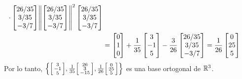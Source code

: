 \begin{solution}
\begin{align*}
{		\cdot
		\begin{bmatrix}
			26/35 \\ 3/35 \\ -3/7
		\end{bmatrix}
		}{\norm{
		\begin{bmatrix}
			26/35 \\ 3/35 \\ -3/7
		\end{bmatrix}
			}^{2}}
		\begin{bmatrix}
			26/35 \\ 3/35 \\ -3/7
		\end{bmatrix}\\
		&=
		\begin{bmatrix}
			0 \\ 1 \\ 0
		\end{bmatrix}
		+
		\dfrac{1}{35}
		\begin{bmatrix}
			3\\ -1 \\ 5
		\end{bmatrix}
		-
		\dfrac{3}{26}
		\begin{bmatrix}
			26/35 \\ 3/35 \\ -3/7
		\end{bmatrix}
		=\dfrac{1}{26}
		\begin{bmatrix}
			0 \\ 25 \\ 5
		\end{bmatrix}
	\end{align*}
	Por lo tanto, $\set{
	\begin{bsmallmatrix}
		3\\ -1 \\ 5
	\end{bsmallmatrix},
	\frac{1}{35}
	\begin{bsmallmatrix}
		26 \\ 3 \\ -15
	\end{bsmallmatrix},
	\frac{1}{26}
	\begin{bsmallmatrix}
		0 \\ 25 \\ 5
	\end{bsmallmatrix}
	}$ es una base ortogonal de $\rmath[3]$.
\end{solution}